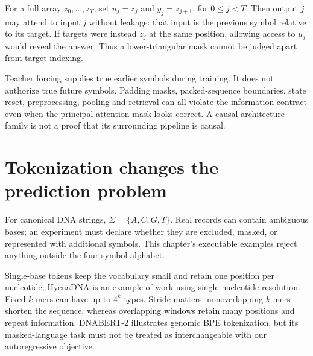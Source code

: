 
For a full array $z_0,\ldots,z_T$, set $u_j=z_j$ and $y_j=z_{j+1}$, for $0\le j<T$. Then output $j$ may attend to input $j$ without leakage: that input is the previous symbol relative to its target. If targets were instead $z_j$ at the same position, allowing access to $u_j$ would reveal the answer. Thus a lower-triangular mask cannot be judged apart from target indexing.

Teacher forcing supplies true earlier symbols during training. It does not authorize true future symbols. Padding masks, packed-sequence boundaries, state reset, preprocessing, pooling and retrieval can all violate the information contract even when the principal attention mask looks correct. A causal architecture family is not a proof that its surrounding pipeline is causal.

\section{Tokenization changes the prediction problem}
For canonical DNA strings, $\Sigma=\{A,C,G,T\}$. Real records can contain ambiguous bases; an experiment must declare whether they are excluded, masked, or represented with additional symbols. This chapter's executable examples reject anything outside the four-symbol alphabet.


Single-base tokens keep the vocabulary small and retain one position per nucleotide; HyenaDNA is an example of work using single-nucleotide resolution.\cite{e2hyena} Fixed $k$-mers can have up to $4^k$ types. Stride matters: nonoverlapping $k$-mers shorten the sequence, whereas overlapping windows retain many positions and repeat information. DNABERT-2 illustrates genomic BPE tokenization,\cite{e2dnabert} but its masked-language task must not be treated as interchangeable with our autoregressive objective.

